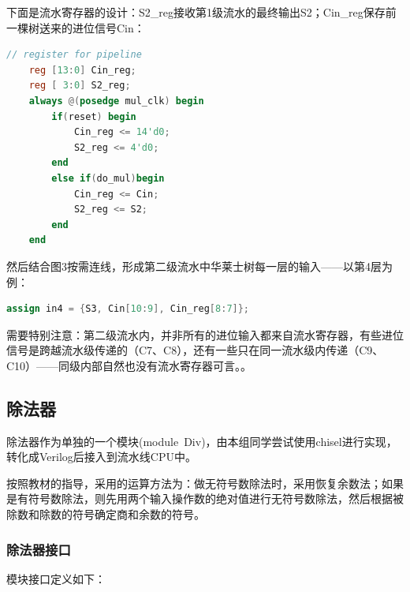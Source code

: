 \documentclass[11pt]{article}
\begin{document}
下面是流水寄存器的设计：S2_reg接收第1级流水的最终输出S2；Cin_reg保存前一棵树送来的进位信号Cin：

\begin{lstlisting}[language=Verilog, caption={华莱士树流水寄存器}]
    // register for pipeline
    reg [13:0] Cin_reg;
    reg [ 3:0] S2_reg;
    always @(posedge mul_clk) begin
        if(reset) begin
            Cin_reg <= 14'd0;
            S2_reg <= 4'd0;
        end 
        else if(do_mul)begin
            Cin_reg <= Cin;
            S2_reg <= S2;
        end
    end
\end{lstlisting}

然后结合图3按需连线，形成第二级流水中华莱士树每一层的输入——以第4层为例：

\begin{lstlisting}[language=Verilog, caption={华莱士树第4层的输入}]
assign in4 = {S3, Cin[10:9], Cin_reg[8:7]};
\end{lstlisting}

需要特别注意：第二级流水内，并非所有的进位输入都来自流水寄存器，有些进位信号是跨越流水级传递的（C7、C8），还有一些只在同一流水级内传递（C9、C10）——同级内部自然也没有流水寄存器可言。。


\subsection{除法器}
除法器作为单独的一个模块(module\  Div)，由本组同学尝试使用chisel进行实现，转化成Verilog后接入到流水线CPU中。

按照教材的指导，采用的运算方法为：做无符号数除法时，采用恢复余数法；如果是有符号数除法，则先用两个输入操作数的绝对值进行无符号数除法，然后根据被除数和除数的符号确定商和余数的符号。

\subsubsection{除法器接口}

模块接口定义如下：
\end{document}
